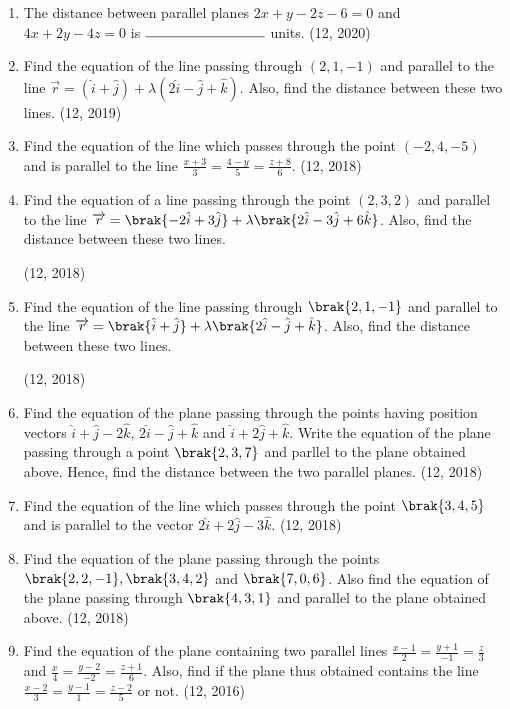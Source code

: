 \begin{enumerate}[label=\thesubsection.\arabic*, ref=\thesubsection.\theenumi]
\item The distance between parallel planes $2x + y - 2z - 6 = 0$ and $4x + 2y - 4z = 0$ is $\rule{3cm}{0.15mm}$ units.
\hfill (12, 2020)
	\item Find the equation of the line passing through $(2, 1, -1)$ and parallel to the line $\overrightarrow{r} = (\hat{i} + \hat{j}) + \lambda (2\hat{i} - \hat{j} + \hat{k})$. Also, find the distance between these two lines. \hfill (12, 2019)
\item Find the equation of the line which passes through the point $(-2, 4, -5)$ and is parallel to the line 
	$
\frac{x + 3}{3} = \frac{4 - y}{5} = \frac{z + 8}{6}.
$
\hfill (12, 2018)
\item Find the equation of a line passing through the point $(2,3,2)$ and parallel to the line $\overrightarrow{r} = \brak{-2\hat{i}+3\hat{j}}+\lambda\brak{2\hat{i}-3\hat{j}+6\hat{k}}$. Also, find the distance between these two lines.

\hfill (12, 2018) 
\item  Find the equation of the line passing through $\brak{2, 1, -1}$ and parallel to the line $\overrightarrow{r}=\brak{\hat{i}+\hat{j}}+\lambda\brak{2\hat{i}-\hat{j}+\hat{k}}$. Also, find the distance between these two lines.

\hfill (12, 2018) 
\item Find the equation of the plane passing through the points having position vectors $\hat{i} + \hat{ j} - 2\hat{k}$, $2\hat{i}-\hat{j} + \hat{k}$ and $\hat{i} + 2\hat{j} + \hat{k}$. Write the equation of the plane passing through a point $\brak{2,3,7}$ and parllel to the plane obtained above. Hence, find the distance between the two parallel planes.
\hfill (12, 2018) 
\item Find the equation of the line which passes through the point $\brak{3,4,5}$ and is parallel to the vector $2\hat{i}+2\hat{j}-3\hat{k}$.
\hfill (12, 2018) 
\item Find the equation of the plane passing through the points $\brak{2,2,-1},\brak{3,4,2}$ and $\brak{7,0,6}$. Also find the equation of the plane passing through $\brak{4,3,1}$ and parallel to the plane obtained above.
\hfill (12, 2018) 
\item Find the equation of the plane containing two parallel lines
      $\frac{x-1}{2} = \frac{y+1}{-1} = \frac{z}{3}$ and $\frac{x}{4} = \frac{y-2}{-2} = \frac{z+1}{6}$.
      Also, find if the plane thus obtained contains the line
      $\frac{x-2}{3} =\frac{y-1}{1} = \frac{z-2}{5}$ or not. \hfill (12, 2016)

\end{enumerate}
